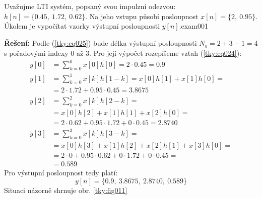   \begin{tkyexam}{Uvažujme LTI systém, popsaný svou impulzní odezvou: \(h[n] = \{\num{0.45},\:
    \num{1.72},\:\num{0.62}\}\). Na jeho vstupu působí posloupnost \(x[n] = \{2,\:\num{0.95}\}\).
    Úkolem  je vypočítat vzorky výstupní posloupnosti \(y[n]\).}{exam001}

    \noindent\textbf{Řešení:} Podle (\ref{tky:eq025}) bude délka výstupní posloupnosti \(N_y = 2 + 3
    - 1= 4\) s pořadovými indexy 0 až 3. Pro její výpočet rozepíšeme vztah (\ref{tky:eq024}):
    \begin{align*}
      y[0] &= \sum_{k=0}^0 x[0]h[0] = \num{2}\cdot\num{0.45} = \num{0.9}                   \\
      y[1] &= \sum_{k=0}^1 x[k]h[1-k] = x[0]h[1] + x[1]h[0] =                              \\
           &=  \num{2}\cdot\num{1.72} + \num{0.95}\cdot\num{0.45} = \num{3.8675}           \\
      y[2] &= \sum_{k=0}^2 x[k]h[2-k] =                                                    \\
           &= x[0]h[2] + x[1]h[1] + x[2]h[0] =                                             \\
           &= \num{2}\cdot\num{0.62} + \num{0.95}\cdot\num{1.72} + \num{0}\cdot\num{0.45}  
            = \num{2.8740}                                                                 \\
      y[3] &= \sum_{k=0}^3 x[k]h[3-k] =                                                    \\
           &= x[0]h[3] + x[1]h[2] + x[2]h[1] +  x[3]h[0] =                                 \\
           &= \num{2}\cdot\num{0} + \num{0.95}\cdot\num{0.62} + \num{0}\cdot\num{1.72}
            + \num{0}\cdot\num{0.45} =                                                     \\
           &= \num{0.589} 
    \end{align*} 
    Pro výstupní posloupnost tedy platí:
    \begin{equation*}
      y[n] = \{\num{0.9},\:\num{3.8675},\:\num{2.8740},\:\num{0.589}\}
    \end{equation*}
    Situaci názorně shrnuje obr. \ref{tky:fig011}

    {\centering
      \captionsetup{type=figure}
      \label{tky:fig011}
    \par}


\end{tkyexam}
